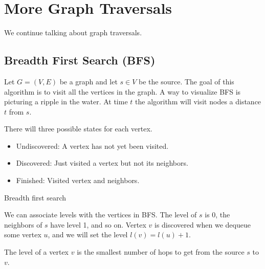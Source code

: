 
\section{More Graph Traversals}

We continue talking about graph traversals.

\subsection{Breadth First Search (BFS)}

Let $G = (V, E)$ be a graph and let $s \in V$ be the source. The goal of this
algorithm is to visit all the vertices in the graph. A way to visualize BFS is 
picturing a ripple in the water. At time $t$ the algorithm will visit
nodes a distance $t$ from $s$.

There will three possible states for each vertex. 

\begin{itemize}
    \item Undiscovered: A vertex has not yet been visited.
    \item Discovered: Just visited a vertex but not its neighbors.
    \item Finished: Visited vertex and neighbors.
\end{itemize}

\begin{algorithm}
\caption{Breadth first search}
\begin{algorithmic}
\ENDFOR
\ENDIF
\ENDWHILE
\end{algorithmic}
\end{algorithm}

We can associate levels with the vertices in BFS. The level of $s$ is
0, the neighbors of $s$ have level 1, and so on. Vertex $v$ is
discovered when we dequeue some vertex $u$, and we will set the level
$l
(v) = l(u) + 1$.

\begin{theorem}
    The level of a vertex $v$ is the smallest number of hops to
get from the source $s$ to $v$.
\end{theorem}

